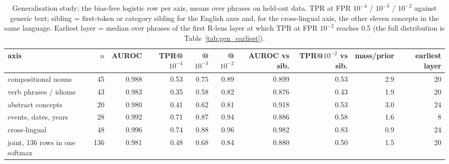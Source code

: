\begin{table}[t]
\centering
\small
\caption{Generalisation study: the bias-free logistic row per axis, means over phrases on held-out data. TPR at FPR $10^{-4}$ / $10^{-3}$ / $10^{-2}$ against generic text; sibling = first-token or category sibling for the English axes and, for the cross-lingual axis, the other eleven concepts in the same language. Earliest layer = median over phrases of the first R-lens layer at which TPR at FPR $10^{-2}$ reaches 0.5 (the full distribution is Table~\ref{tab:gen_earliest}).}
\label{tab:gen_headline}
\begin{adjustbox}{max width=\textwidth}
\begin{tabular}{lrrrrrrrrr}
\toprule
axis & $n$ & AUROC & TPR@$10^{-4}$ & @$10^{-3}$ & @$10^{-2}$ & AUROC vs sib. & TPR@$10^{-2}$ vs sib. & mass/prior & earliest layer \\
\midrule
compositional nouns & 45 & 0.988 & 0.53 & 0.75 & 0.89 & 0.899 & 0.53 & 2.9 & 20 \\
verb phrases / idioms & 43 & 0.983 & 0.35 & 0.58 & 0.82 & 0.876 & 0.43 & 1.9 & 20 \\
abstract concepts & 20 & 0.980 & 0.41 & 0.62 & 0.81 & 0.918 & 0.53 & 3.0 & 24 \\
events, dates, years & 28 & 0.992 & 0.71 & 0.87 & 0.94 & 0.886 & 0.58 & 1.6 & 8 \\
cross-lingual & 48 & 0.996 & 0.74 & 0.88 & 0.96 & 0.982 & 0.83 & 0.9 & 24 \\
joint, 136 rows in one softmax & 136 & 0.981 & 0.48 & 0.68 & 0.84 & 0.880 & 0.50 & 1.5 & 20 \\
\bottomrule
\end{tabular}
\end{adjustbox}
\end{table}